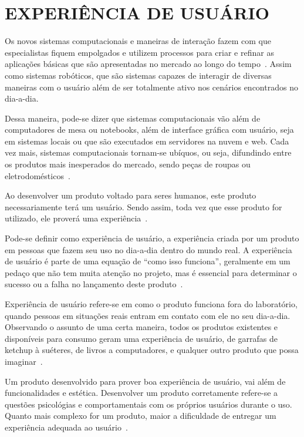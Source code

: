 \chapter{EXPERIÊNCIA DE USUÁRIO}
\label{cap:ux}
Os novos sistemas computacionais e maneiras de interação fazem com que especialistas fiquem empolgados e utilizem processos para criar e refinar as aplicações básicas que são apresentadas no mercado ao longo do tempo~\cite{hartson:2012}. Assim como sistemas robóticos, que são sistemas capazes de interagir de diversas maneiras com o usuário além de ser totalmente ativo nos cenários encontrados no dia-a-dia.

Dessa maneira, pode-se dizer que sistemas computacionais vão além de computadores de mesa ou notebooks, além de interface gráfica com usuário, seja em sistemas locais ou que são executados em servidores na nuvem e web. Cada vez mais, sistemas computacionais tornam-se ubíquos, ou seja, difundindo entre os produtos mais inesperados do mercado, sendo peças de roupas ou eletrodomésticos~\cite{hartson:2012}.

Ao desenvolver um produto voltado para seres humanos, este produto necessariamente terá um usuário. Sendo assim, toda vez que esse produto for utilizado, ele proverá uma experiência~\cite{garrett:2010}.

Pode-se definir como experiência de usuário, a experiência criada por um produto em pessoas que fazem seu uso no dia-a-dia dentro do mundo real. A experiência de usuário é parte de uma equação de ``como isso funciona'', geralmente em um pedaço que não tem muita atenção no projeto, mas é essencial para determinar o sucesso ou a falha no lançamento deste produto~\cite{garrett:2010}.

Experiência de usuário refere-se em como o produto funciona fora do laboratório, quando pessoas em situações reais entram em contato com ele no seu dia-a-dia. Observando o assunto de uma certa maneira, todos os produtos existentes e disponíveis para consumo geram uma experiência de usuário, de garrafas de ketchup à suéteres, de livros a computadores, e qualquer outro produto que possa imaginar~\cite{garrett:2010}.

Um produto desenvolvido para prover boa experiência de usuário, vai além de funcionalidades e estética. Desenvolver um produto corretamente refere-se a questões psicológias e comportamentais com os próprios usuários durante o uso. Quanto mais complexo for um produto, maior a dificuldade de entregar um experiência adequada ao usuário~\cite{garrett:2010}.

